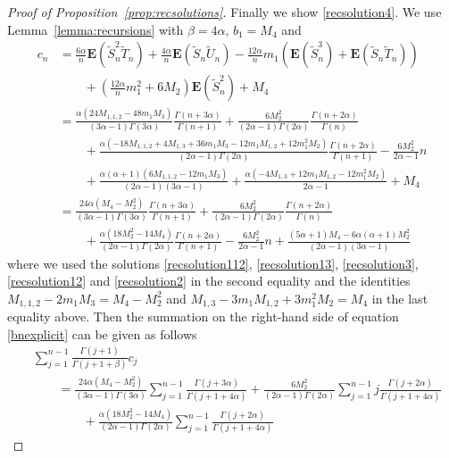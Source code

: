 \documentclass[12pt,a4paper]{article}
\newcommand{\E}{\mathbf E}
\newcommand{\wt}{\widetilde}
\numberwithin{equation}{section}
\begin{document}
\begin{proof}[Proof of Proposition~\ref{prop:recsolutions}]
Finally we show \eqref{recsolution4}.
We use Lemma~\ref{lemma:recursions} with $\beta=4\alpha$, $b_1=M_4$ and
\begin{equation}\begin{aligned}
c_n&=\frac{6\alpha}n\E(\wt S_n^2\wt T_n)+\frac{4\alpha}n\E(\wt S_n\wt U_n)-\frac{12\alpha}nm_1\left(\E(\wt S_n^3)+\E(\wt S_n\wt T_n)\right)\\
&\qquad+\left(\frac{12\alpha}nm_1^2+6M_2\right)\E(\wt S_n^2)+M_4\\
&=\frac{\alpha(24M_{1,1,2}-48m_1M_3)}{(3\alpha-1)\Gamma(3\alpha)}\frac{\Gamma(n+3\alpha)}{\Gamma(n+1)}
+\frac{6M_2^2}{(2\alpha-1)\Gamma(2\alpha)}\frac{\Gamma(n+2\alpha)}{\Gamma(n)}\\
&\qquad+\frac{\alpha(-18M_{1,1,2}+4M_{1,3}+36m_1M_3-12m_1M_{1,2}+12m_1^2M_2)}{(2\alpha-1)\Gamma(2\alpha)}\frac{\Gamma(n+2\alpha)}{\Gamma(n+1)}
-\frac{6M_2^2}{2\alpha-1}n\\
&\qquad+\frac{\alpha(\alpha+1)(6M_{1,1,2}-12m_1M_3)}{(2\alpha-1)(3\alpha-1)}+\frac{\alpha(-4M_{1,3}+12m_1M_{1,2}-12m_1^2M_2)}{2\alpha-1}+M_4\\
&=\frac{24\alpha(M_4-M_2^2)}{(3\alpha-1)\Gamma(3\alpha)}\frac{\Gamma(n+3\alpha)}{\Gamma(n+1)}
+\frac{6M_2^2}{(2\alpha-1)\Gamma(2\alpha)}\frac{\Gamma(n+2\alpha)}{\Gamma(n)}\\
&\qquad+\frac{\alpha(18M_2^2-14M_4)}{(2\alpha-1)\Gamma(2\alpha)}\frac{\Gamma(n+2\alpha)}{\Gamma(n+1)}-\frac{6M_2^2}{2\alpha-1}n
+\frac{(5\alpha+1)M_4-6\alpha(\alpha+1)M_2^2}{(2\alpha-1)(3\alpha-1)}
\end{aligned}\end{equation}
where we used the solutions \eqref{recsolution112}, \eqref{recsolution13}, \eqref{recsolution3}, \eqref{recsolution12} and \eqref{recsolution2}
in the second equality and the identities $M_{1,1,2}-2m_1M_3=M_4-M_2^2$ and $M_{1,3}-3m_1M_{1,2}+3m_1^2M_2=M_4$ in the last equality above.
Then the summation on the right-hand side of equation \eqref{bnexplicit} can be given as follows
\begin{equation}\label{reccompute4}\begin{aligned}
&\sum_{j=1}^{n-1}\frac{\Gamma(j+1)}{\Gamma(j+1+\beta)}c_j\\
&\qquad=\frac{24\alpha(M_4-M_2^2)}{(3\alpha-1)\Gamma(3\alpha)}\sum_{j=1}^{n-1}\frac{\Gamma(j+3\alpha)}{\Gamma(j+1+4\alpha)}
+\frac{6M_2^2}{(2\alpha-1)\Gamma(2\alpha)}\sum_{j=1}^{n-1}j\frac{\Gamma(j+2\alpha)}{\Gamma(j+1+4\alpha)}\\
&\qquad\qquad+\frac{\alpha(18M_2^2-14M_4)}{(2\alpha-1)\Gamma(2\alpha)}\sum_{j=1}^{n-1}\frac{\Gamma(j+2\alpha)}{\Gamma(j+1+4\alpha)}

\end{aligned}
\end{equation}
\end{proof}
\end{document}
